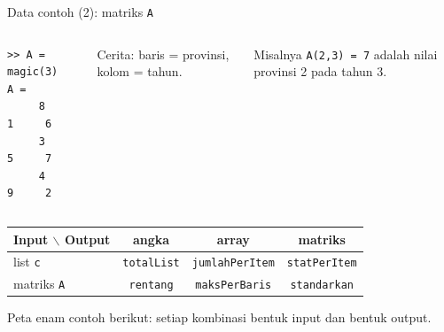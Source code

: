 \documentclass[aspectratio=169,11pt]{beamer}
\begin{document}
\begin{frame}[fragile]{Data contoh (2): matriks \texttt{A}}
\begin{columns}[c]
\begin{lstlisting}[basicstyle=\ttfamily\footnotesize]
>> A = magic(3)
A =
     8     1     6
     3     5     7
     4     9     2
\end{lstlisting}
\centering
{}
\small Cerita: \alert{baris = provinsi}, \alert{kolom = tahun}.

\vspace{0.3em}
Misalnya \texttt{A(2,3) = 7} adalah nilai provinsi 2 pada tahun 3.
\end{columns}

\vspace{0.8em}
\centering\footnotesize
\renewcommand{\arraystretch}{1.15}
\begin{tabular}{l c c c}
\toprule
Input $\backslash$ Output & angka & array & matriks \\
\midrule
list \texttt{c} & \texttt{totalList} & \texttt{jumlahPerItem} & \texttt{statPerItem} \\
matriks \texttt{A} & \texttt{rentang} & \texttt{maksPerBaris} & \texttt{standarkan} \\
\bottomrule
\end{tabular}

\vspace{0.3em}
\scriptsize Peta enam contoh berikut: setiap kombinasi bentuk input dan bentuk
output.
\end{frame}
\end{document}
